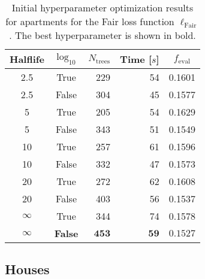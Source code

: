 \begin{table}[h!]
  \begin{tabular}{@{}ccrrc@{}}
    Halflife & $\log_{10}$ & $N_\mathrm{trees}$ & Time [$s$] & $f_\mathrm{eval}$ \\
    \midrule
    \num{2.5} & True & \num{229} & \num{54} & \num{0.1601} \\
    \num{2.5} & False & \num{304} & \num{45} & \num{0.1577} \\
    \num{5} & True & \num{205} & \num{54} & \num{0.1629} \\
    \num{5} & False & \num{343} & \num{51} & \num{0.1549} \\
    \num{10} & True & \num{257} & \num{61} & \num{0.1596} \\
    \num{10} & False & \num{332} & \num{47} & \num{0.1573} \\
    \num{20} & True & \num{272} & \num{62} & \num{0.1608} \\
    \num{20} & False & \num{403} & \num{56} & \num{0.1537} \\
    $\infty$ & True & \num{344} & \num{74} & \num{0.1578} \\
    $\bm{\infty}$ & \textbf{False} & $\mathbf{453}$ & $\mathbf{59}$ & $\mathbf{0.1527}$ \\
  \end{tabular}
  \caption[Initial Hyperparameter Optimization Results for Apartments -- Fair Loss Function]{\label{tab:h:HPO_initial_Fair-ejerlejlighed-appendix}Initial hyperparameter optimization results for apartments for the Fair loss function $\ell_\mathrm{Fair}$. The best hyperparameter is shown in bold.}
\end{table}






\FloatBarrier
\subsection*{Houses}



